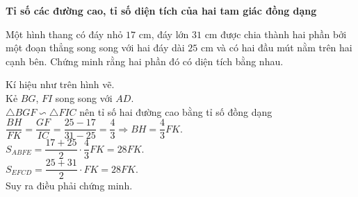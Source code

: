 \noindent\textbf{Tỉ số các đường cao, tỉ số diện tích của hai tam giác đồng dạng}
\begin{bt}%
 Một hình thang có đáy nhỏ $17$ cm, đáy lớn $31$ cm được chia thành hai phần bởi một đoạn thẳng song song với hai đáy dài $25$ cm và có hai đầu mút nằm trên hai cạnh bên. Chứng minh rằng hai phần đó có diện tích bằng nhau.
 \loigiai
  {
  \immini
  {
  Kí hiệu như trên hình vẽ.\\
  Kẻ $BG$, $FI$ song song với $AD$.\\
  $\triangle BGF \backsim \triangle FIC$ nên tỉ số hai đường cao bằng tỉ số đồng dạng\\
  $\dfrac{BH}{FK} = \dfrac{GF}{IC} = \dfrac{25-17}{31-25} = \dfrac{4}{3} \Rightarrow BH = \dfrac{4}{3}FK$.\\
  $S_{ABFE} = \dfrac{17+25}{2} \cdot \dfrac{4}{3}FK = 28FK$.\\
  $S_{EFCD} = \dfrac{25+31}{2} \cdot FK = 28FK$.\\
  Suy ra điều phải chứng minh.
  }
  {
  }
  }
\end{bt}


